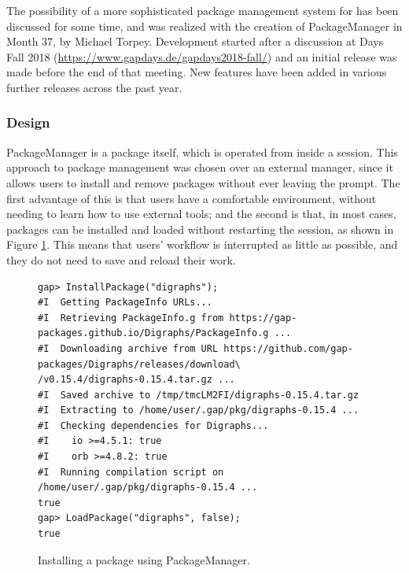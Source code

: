 The possibility of a more sophisticated package management system for \GAP has
been discussed for some time, and was realized with the creation of {\sf
  PackageManager} \cite{PackageManager} in
Month 37, by Michael Torpey.  Development started after a discussion at
\GAP Days Fall 2018 (\url{https://www.gapdays.de/gapdays2018-fall/}) and an
initial release was made before the end of that meeting.  New features have been
added in various further releases across the past year.


\subsubsection{Design}

{\sf PackageManager} is a \GAP package itself, which is operated from inside a
\GAP session.  This approach to package management was chosen over an external
manager, since it allows users to install and remove packages without ever
leaving the \GAP prompt.  The first advantage of this is that
users have a comfortable environment, without needing to learn how to use
external tools; and the second is that, in most cases, packages can be installed
and loaded without restarting the session, as shown in Figure \ref{fig:pkgman-sample}.
This means that users' workflow is interrupted as little as possible, and they do
not need to save and reload their work.

\begin{figure}[!ht]
    \centering
    {\tiny
\begin{verbatim}
gap> InstallPackage("digraphs");
#I  Getting PackageInfo URLs...
#I  Retrieving PackageInfo.g from https://gap-packages.github.io/Digraphs/PackageInfo.g ...
#I  Downloading archive from URL https://github.com/gap-packages/Digraphs/releases/download\
/v0.15.4/digraphs-0.15.4.tar.gz ...
#I  Saved archive to /tmp/tmcLM2FI/digraphs-0.15.4.tar.gz
#I  Extracting to /home/user/.gap/pkg/digraphs-0.15.4 ...
#I  Checking dependencies for Digraphs...
#I    io >=4.5.1: true
#I    orb >=4.8.2: true
#I  Running compilation script on /home/user/.gap/pkg/digraphs-0.15.4 ...
true
gap> LoadPackage("digraphs", false);
true
\end{verbatim}
    }
    \caption{Installing a package using {\sf PackageManager}.}
    \label{fig:pkgman-sample}
\end{figure}

